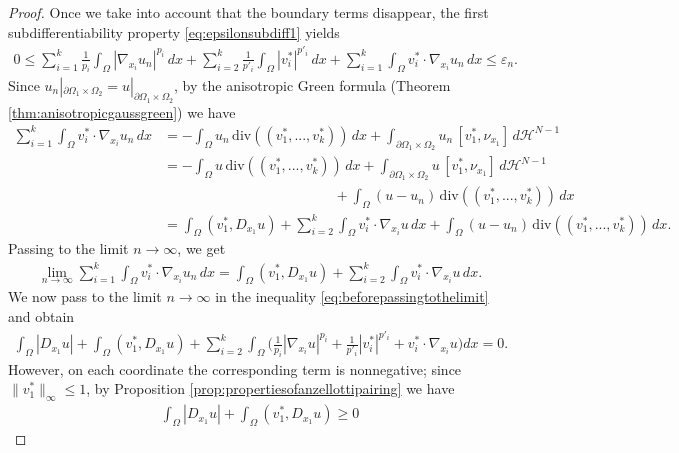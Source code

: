 \documentclass[reqno,12pt]{amsart}
\numberwithin{equation}{section}
\begin{document}
\begin{proof}
Once we take into account that the boundary terms disappear, the first subdifferentiability property \eqref{eq:epsilonsubdiff1} yields
\begin{align}\label{eq:beforepassingtothelimit}
0 \leq \sum_{i=1}^k \frac{1}{p_i} \int_\Omega |\nabla_{x_i} u_n|^{p_i} \, dx + \sum_{i=2}^k \frac{1}{p'_i} \int_\Omega |v_i^*|^{p'_i} \, dx + \sum_{i=1}^k \int_\Omega v_i^* \cdot \nabla_{x_i} u_n \, dx  \leq \varepsilon_n.
\end{align}
Since $u_n|_{\partial\Omega_1 \times \Omega_2} = u|_{\partial\Omega_1 \times \Omega_2}$, by the anisotropic Green formula (Theorem \ref{thm:anisotropicgaussgreen}) we have
\begin{align}
\sum_{i=1}^k \int_\Omega v_i^* \cdot \nabla_{x_i} u_n \, dx &= - \int_{\Omega} u_n \, \mathrm{div}((v_1^*,...,v_k^*)) \, dx + \int_{\partial\Omega_1 \times \Omega_2} u_n \, [v_1^*, \nu_{x_1}] \,d\mathcal{H}^{N-1} \\
&= - \int_{\Omega} u \, \mathrm{div}((v_1^*,...,v_k^*)) \, dx + \int_{\partial\Omega_1 \times \Omega_2} u \, [v_1^*, \nu_{x_1}] \, d\mathcal{H}^{N-1} \\
&\qquad\qquad\qquad\qquad\qquad\qquad\, + \int_{\Omega} (u - u_n) \, \mathrm{div}((v_1^*,...,v_k^*)) \, dx \\
&= \int_{\Omega} (v_1^*, D_{x_1} u) + \sum_{i=2}^k \int_\Omega v_i^* \cdot \nabla_{x_i} u \, dx + \int_{\Omega} (u - u_n) \, \mathrm{div}((v_1^*,...,v_k^*)) \, dx.
\end{align}
Passing to the limit $n \rightarrow \infty$, we get
\begin{align}
\lim_{n \rightarrow \infty} \sum_{i=1}^k \int_\Omega v_i^* \cdot \nabla_{x_i} u_n \, dx = \int_{\Omega} (v_1^*, D_{x_1} u) + \sum_{i=2}^k \int_\Omega v_i^* \cdot \nabla_{x_i} u \, dx.
\end{align}
We now pass to the limit $n \rightarrow \infty$ in the inequality \eqref{eq:beforepassingtothelimit} and obtain
\begin{align}
\int_\Omega |D_{x_1} u| + \int_{\Omega} (v_1^*, D_{x_1} u)  + \sum_{i=2}^k \int_\Omega \bigg( \frac{1}{p_i} |\nabla_{x_i} u|^{p_i} + \frac{1}{p'_i} |v_i^*|^{p'_i} + v_i^* \cdot \nabla_{x_i} u \bigg) dx = 0.
\end{align}
However, on each coordinate the corresponding term is nonnegative; since $\| v_1^* \|_\infty \leq 1$, by Proposition \ref{prop:propertiesofanzellottipairing} we have
\begin{align}
\int_\Omega |D_{x_1} u| + \int_{\Omega} (v_1^*, D_{x_1} u) \geq 0
\end{align}

\end{proof}
\end{document}
